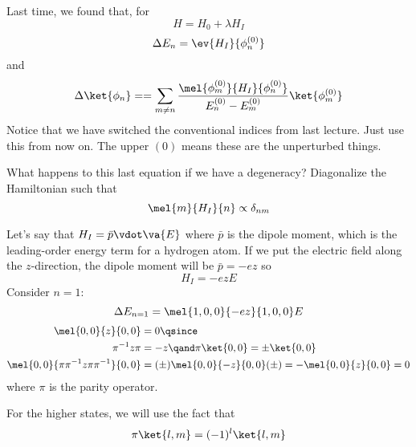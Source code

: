 \documentclass[a4paper,twoside,master.tex]{subfiles}
\begin{document}

Last time, we found that, for
\begin{equation}
    H = H_0 + \lambda H_I
\end{equation}
\begin{equation}
    \Delta E_n = \ev{H_I}{\phi_n^{(0)}}
\end{equation}
and
\begin{equation}
    \Delta\ket{\phi_n} = = \sum_{m \neq n} \frac{\mel{\phi_m^{(0)}}{H_I}{\phi_n^{(0)}}}{E_n^{(0)} - E_m^{(0)}}\ket{\phi_m^{(0)}}
\end{equation}
Notice that we have switched the conventional indices from last lecture. Just use this from now on. The upper $ (0) $ means these are the unperturbed things.

What happens to this last equation if we have a degeneracy? Diagonalize the Hamiltonian such that
\begin{equation}
    \mel{m}{H_I}{n} \propto \delta_{nm}
\end{equation}

Let's say that $ H_I = \bar{p} \vdot \va{E} $ where $ \bar{p} $ is the dipole moment, which is the leading-order energy term for a hydrogen atom. If we put the electric field along the $ z $-direction, the dipole moment will be $ \bar{p} = -ez $ so
\begin{equation}
    H_I = -ezE
\end{equation}
Consider $ n = 1 $:
\begin{equation}
    \Delta E_{n=1} = \mel{1,0,0}{-ez}{1,0,0}E
\end{equation}
\begin{align}
    \mel{0,0}{z}{0,0} &= 0 \qsince \\
    \pi^{-1} z \pi &= -z \qand \pi\ket{0,0} = \pm\ket{0,0} \\
    \mel{0,0}{\pi \pi^{-1} z \pi \pi^{-1}}{0,0} &= (\pm) \mel{0,0}{-z}{0,0}(\pm) = - \mel{0,0}{z}{0,0} = 0
\end{align}
where $ \pi $ is the parity operator.

For the higher states, we will use the fact that
\begin{equation}
    \pi\ket{l,m} = (-1)^l\ket{l,m}
\end{equation}
\end{document}
